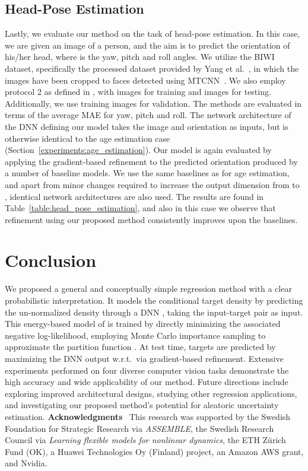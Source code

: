 \documentclass[runningheads]{llncs}
\newcommand{\parsection}[1]{\noindent\textbf{#1}~ }
\begin{document}
\subsection{Head-Pose Estimation}
\label{experiments:head_pose_estimation}

Lastly, we evaluate our method on the task of head-pose estimation. In this case, we are given an image  of a person, and the aim is to predict the orientation  of his/her head, where  is the yaw, pitch and roll angles. We utilize the BIWI~\cite{fanelli2013random} dataset, specifically the processed dataset provided by Yang et al.~\cite{yang2019fsa}, in which the images have been cropped to faces detected using MTCNN~\cite{zhang2016joint}. We also employ protocol 2 as defined in \cite{yang2019fsa}, with  images for training and  images for testing. Additionally, we use  training images for validation. The methods are evaluated in terms of the average MAE for yaw, pitch and roll. The network architecture of the DNN  defining our model takes the image  and orientation  as inputs, but is otherwise identical to the age estimation case (Section~\ref{experiments:age_estimation}). Our model is again evaluated by applying the gradient-based refinement to the predicted orientation  produced by a number of baseline models. We use the same baselines as for age estimation, and apart from minor changes required to increase the output dimension from  to , identical network architectures are also used. The results are found in Table~\ref{table:head_pose_estimation}, and also in this case we observe that refinement using our proposed method consistently improves upon the baselines. \section{Conclusion}
\label{section: conclusion}

We proposed a general and conceptually simple regression method with a clear probabilistic interpretation. It models the conditional target density  by predicting the un-normalized density through a DNN , taking the input-target pair  as input. This energy-based model  of  is trained by directly minimizing the associated negative log-likelihood, employing Monte Carlo importance sampling to approximate the partition function . At test time, targets are predicted by maximizing the DNN output  w.r.t.\  via gradient-based refinement. Extensive experiments performed on four diverse computer vision tasks demonstrate the high accuracy and wide applicability of our method. Future directions include exploring improved architectural designs, studying other regression applications, and investigating our proposed method's potential for aleatoric uncertainty estimation. 
\parsection{Acknowledgments}
This research was supported by the Swedish Foundation for Strategic Research via \emph{ASSEMBLE}, the Swedish Research Council via \emph{Learning flexible models for nonlinear dynamics}, the ETH Z\"urich Fund (OK), a Huawei Technologies Oy (Finland) project, an Amazon AWS grant, and Nvidia.
\end{document}
